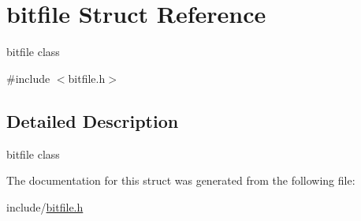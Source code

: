 \hypertarget{structbitfile}{\section{bitfile Struct Reference}
\label{structbitfile}
}


bitfile class  




{\ttfamily \#include $<$bitfile.\+h$>$}



\subsection{Detailed Description}
bitfile class 

The documentation for this struct was generated from the following file\+:\begin{DoxyCompactItemize}
\item 
include/\hyperlink{bitfile_8h}{bitfile.\+h}\end{DoxyCompactItemize}
